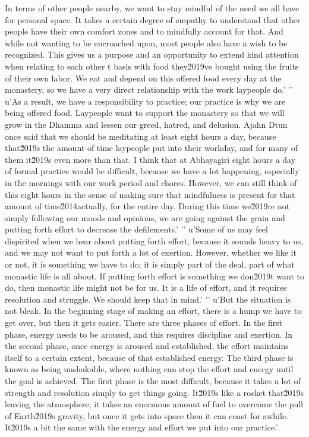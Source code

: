 In terms of other people nearby, we want to stay mindful of the need we 
all have for personal space. It takes a certain degree of empathy to 
understand that other people have their own comfort zones and to 
mindfully account for that. And while not wanting to be encroached 
upon, most people also have a wish to be recognized. This gives us a 
purpose and an opportunity to extend kind attention when relating to 
each other t basis with food they\u2019ve bought using the fruits of their own labor. We eat and depend on this offered food every day at the monastery, so we have a very direct relationship with the work laypeople do.'
'\n'
u'As a result, we have a responsibility to practice; our practice is why we are being offered food. Laypeople want to support the monastery so that we will grow in the Dhamma and lessen our greed, hatred, and delusion. Ajahn Dtun once said that we should be meditating at least eight hours a day, because that\u2019s the amount of time laypeople put into their workday, and for many of them it\u2019s even more than that. I think that at Abhayagiri eight hours a day of formal practice would be difficult, because we have a lot happening, especially in the mornings with our work period and chores. However, we can still think of this eight hours in the sense of making sure that mindfulness is present for that amount of time\u2014actually, for the entire day. During this time we\u2019re not simply following our moods and opinions, we are going against the grain and putting forth effort to decrease the defilements.'
'\n'
u'Some of us may feel dispirited when we hear about putting forth effort, because it sounds heavy to us, and we may not want to put forth a lot of exertion. However, whether we like it or not, it is something we have to do; it is simply part of the deal, part of what monastic life is all about. If putting forth effort is something we don\u2019t want to do, then monastic life might not be for us. It is a life of effort, and it requires resolution and struggle. We should keep that in mind.'
'\n'
u'But the situation is not bleak. In the beginning stage of making an effort, there is a hump we have to get over, but then it gets easier. There are three phases of effort. In the first phase, energy needs to be aroused, and this requires discipline and exertion. In the second phase, once energy is aroused and established, the effort maintains itself to a certain extent, because of that established energy. The third phase is known as being unshakable, where nothing can stop the effort and energy until the goal is achieved. The first phase is the most difficult, because it takes a lot of strength and resolution simply to get things going. It\u2019s like a rocket that\u2019s leaving the atmosphere; it takes an enormous amount of fuel to overcome the pull of Earth\u2019s gravity, but once it gets into space then it can coast for awhile. It\u2019s a bit the same with the energy and effort we put into our practice.'
